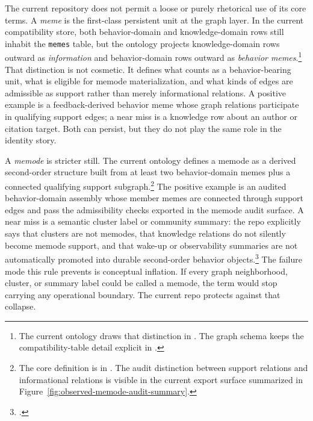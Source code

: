 \documentclass[10pt]{article}
\begin{document}
The current repository does not permit a loose or purely rhetorical use of its core terms. A \emph{meme} is the first-class persistent unit at the graph layer. In the current compatibility store, both behavior-domain and knowledge-domain rows still inhabit the \texttt{memes} table, but the ontology projects knowledge-domain rows outward as \emph{information} and behavior-domain rows outward as \emph{behavior memes}.\footnote{The current ontology draws that distinction in . The graph schema keeps the compatibility-table detail explicit in .} That distinction is not cosmetic. It defines what counts as a behavior-bearing unit, what is eligible for memode materialization, and what kinds of edges are admissible as support rather than merely informational relations. A positive example is a feedback-derived behavior meme whose graph relations participate in qualifying support edges; a near miss is a knowledge row about an author or citation target. Both can persist, but they do not play the same role in the identity story.

A \emph{memode} is stricter still. The current ontology defines a memode as a derived second-order structure built from at least two behavior-domain memes plus a connected qualifying support subgraph.\footnote{The core definition is in . The audit distinction between support relations and informational relations is visible in the current export surface summarized in Figure~\ref{fig:observed-memode-audit-summary}.} The positive example is an audited behavior-domain assembly whose member memes are connected through support edges and pass the admissibility checks exported in the memode audit surface. A near miss is a semantic cluster label or community summary: the repo explicitly says that clusters are not memodes, that knowledge relations do not silently become memode support, and that wake-up or observability summaries are not automatically promoted into durable second-order behavior objects.\footnote{.} The failure mode this rule prevents is conceptual inflation. If every graph neighborhood, cluster, or summary label could be called a memode, the term would stop carrying any operational boundary. The current repo protects against that collapse.
\end{document}
